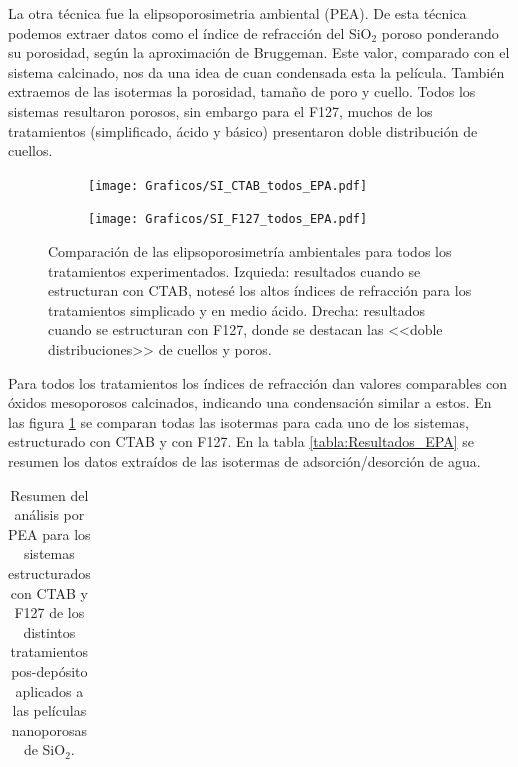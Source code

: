 {			La otra técnica fue la elipsoporosimetria ambiental (PEA). De esta técnica podemos extraer datos como el índice de refracción del SiO$_2$ poroso ponderando su porosidad, según la aproximación de Bruggeman\cite{Bruggeman1935}. Este valor, comparado con el sistema calcinado, nos da una idea de cuan condensada esta la película. También extraemos de las isotermas la porosidad, tamaño de poro y cuello. Todos los sistemas resultaron porosos, sin embargo para el F127, muchos de los tratamientos (simplificado, ácido y básico) presentaron doble distribución de cuellos. 

			\begin{figure}[!th]
		 	   	    \begin{subfigure}[t]{0.49\textwidth}
			       	\texttt{[image: Graficos/SI\_CTAB\_todos\_EPA.pdf]}
			   		\end{subfigure}
			   		\begin{subfigure}[t]{0.49\textwidth}
			   	    \texttt{[image: Graficos/SI\_F127\_todos\_EPA.pdf]}
			   		\end{subfigure}
					 \caption[Comparación PEA tratamientos alternativos]{Comparación de las elipsoporosimetría ambientales para todos los tratamientos experimentados. Izquieda: resultados cuando se estructuran con CTAB, notesé los altos índices de refracción para los tratamientos simplicado y en medio ácido. Drecha: resultados cuando se estructuran con F127, donde se destacan las <<doble distribuciones>> de cuellos y poros.}
					 \label{fig:todos_EPA}	
				     \end{figure}


			Para todos los tratamientos los índices de refracción dan valores comparables con óxidos mesoporosos calcinados, indicando una condensación similar a estos. En las figura \ref{fig:todos_EPA} se comparan todas las isotermas para cada uno de los sistemas, estructurado con CTAB y con F127. En la tabla \ref{tabla:Resultados_EPA} se resumen los datos extraídos de las isotermas de adsorción/desorción de agua.
	
			\begin{table}[ht]
				\caption[Resumen PEA para tratamientos alternativos]{Resumen del análisis por PEA para los sistemas estructurados con CTAB y F127 de los distintos tratamientos pos-depósito aplicados a las películas nanoporosas de SiO$_2$.}
				\begin{tabular}{>{\raggedright\arraybackslash}m{3cm}>{\centering\arraybackslash}m{2.2cm}>{\centering\arraybackslash}m{2cm}>{\centering\arraybackslash}m{2cm}>{\centering\arraybackslash}m{0.8cm}}
				\toprule


\end{tabular}
\end{table}}
